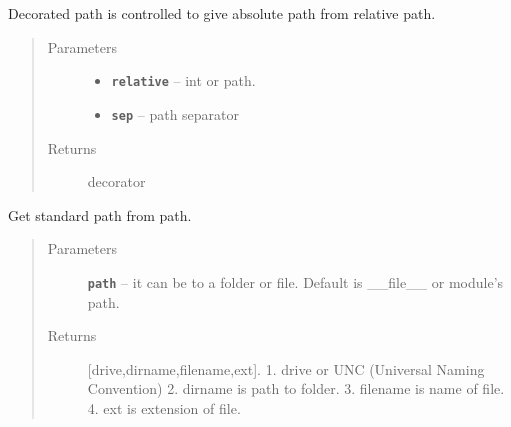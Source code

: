 \documentclass[letterpaper,10pt,english]{sphinxmanual}
\begin{document}

\begin{fulllineitems}
\label{RRtoolbox.lib:RRtoolbox.lib.directory.decoratePath}
Decorated path is controlled to give absolute path from relative path.
\begin{quote}\begin{description}
\item[{Parameters}] \leavevmode\begin{itemize}
\item {} 
\textbf{\texttt{relative}} -- int or path.

\item {} 
\textbf{\texttt{sep}} -- path separator

\end{itemize}

\item[{Returns}] \leavevmode
decorator

\end{description}\end{quote}

\end{fulllineitems}


\begin{fulllineitems}
\label{RRtoolbox.lib:RRtoolbox.lib.directory.getData}
Get standard path from path.
\begin{quote}\begin{description}
\item[{Parameters}] \leavevmode
\textbf{\texttt{path}} -- it can be to a folder or file. Default is \_\_file\_\_ or module's path.

\item[{Returns}] \leavevmode
{[}drive,dirname,filename,ext{]}.
1. drive or UNC (Universal Naming Convention)
2. dirname is path to folder.
3. filename is name of file.
4. ext is extension of file.

\end{description}\end{quote}

\end{fulllineitems}
\end{document}
